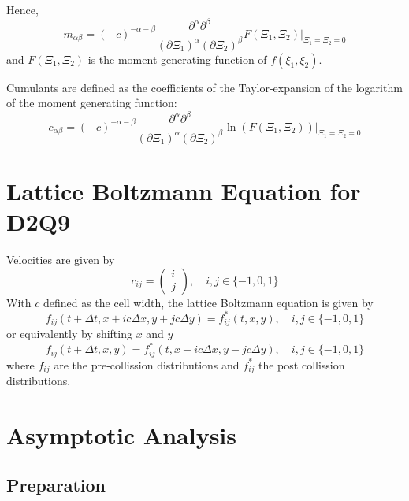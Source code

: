 \documentclass{article}
\begin{document}
Hence,
\begin{equation}
  \label{eq:alternative representation of moments}
  m_{\alpha\beta} = {(-c)}^{-\alpha-\beta} \frac{\partial^\alpha\partial^\beta}{{(\partial \Xi_1)}^\alpha{(\partial \Xi_2)}^\beta} F(\Xi_1, \Xi_2)\Bigr|_{\Xi_1=\Xi_2 = 0}
\end{equation}
and $F(\Xi_1, \Xi_2)$ is the moment generating function of $f(\xi_1, \xi_2)$.

Cumulants are defined as the coefficients of the Taylor-expansion of the logarithm of the moment generating function:
\begin{equation}
  \label{eq:Definition of cumulants}
  c_{\alpha\beta} = {(-c)}^{-\alpha-\beta} \frac{\partial^\alpha\partial^\beta}{{(\partial \Xi_1)}^\alpha{(\partial \Xi_2)}^\beta} \ln(F(\Xi_1, \Xi_2))\Bigr|_{\Xi_1=\Xi_2 = 0}
\end{equation}

\section{Lattice Boltzmann Equation for D2Q9}
\label{sec:Lattice Boltzmann Equation for D2Q9}

Velocities are given by
\begin{equation}
  c_{ij}= \begin{pmatrix}i \\ j\end{pmatrix}, \quad i,j\in \{-1, 0, 1\}
\end{equation}
With $c$ defined as the cell width, the lattice Boltzmann equation is given by
\begin{equation}
  f_{ij}(t + \Delta t, x + ic\Delta x , y + jc\Delta y) = f^*_{ij}(t,x,y), \quad i,j\in \{-1, 0, 1\}
\end{equation}
or equivalently by shifting $x$ and $y$
\begin{equation}
  \label{eq:Lattice Boltzmann Equation}
  f_{ij}(t + \Delta t, x, y) = f^*_{ij}(t,x - ic\Delta x , y - jc\Delta y), \quad i,j\in \{-1, 0, 1\}
\end{equation}
where $f_{ij}$ are the pre-collission distributions and $f^*_{ij}$ the post collission distributions.

\section{Asymptotic Analysis}
\label{sec:Asymptotic Analysis}
\subsection{Preparation}
\label{sub:Preparation}
\end{document}

